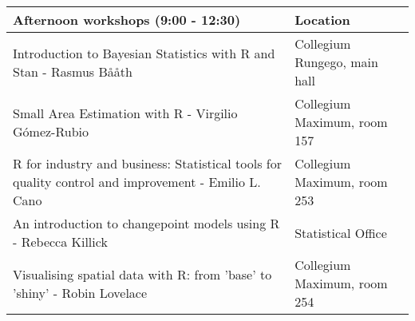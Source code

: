 \begingroup\fontsize{9pt}{10pt}\selectfont
\begin{longtable}{|p{8.2cm}|p{4.6cm}|}
  \hline
Afternoon workshops (9:00 - 12:30) & Location \\ 
  \hline
Introduction to Bayesian Statistics with R and Stan - Rasmus Bååth & Collegium Rungego, main hall \\ 
  Small Area Estimation with R - Virgilio Gómez-Rubio & Collegium Maximum, room 157 \\ 
  R for industry and business: Statistical tools for quality control and improvement - Emilio L. Cano & Collegium Maximum, room 253 \\ 
  An introduction to changepoint models using R - Rebecca Killick & Statistical Office \\ 
  Visualising spatial data with R: from 'base' to 'shiny' - Robin Lovelace & Collegium Maximum, room 254 \\ 
   \hline
\end{longtable}
\endgroup
